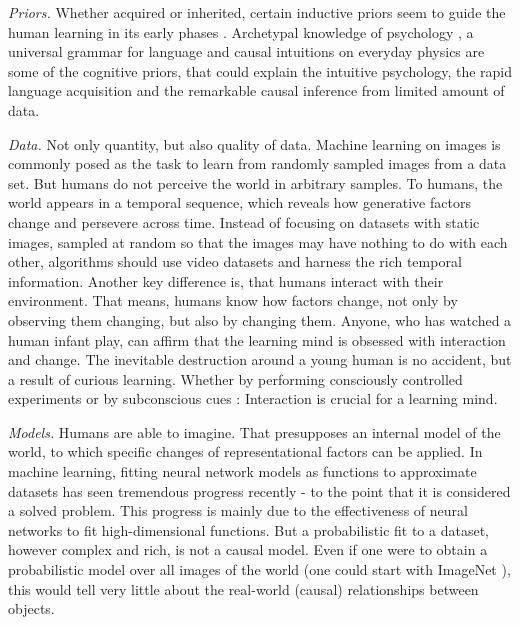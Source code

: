 	\emph{Priors.}
		Whether acquired or inherited, certain inductive priors seem to guide the human learning in its early phases \cite{tenenbaum18think}.
		Archetypal knowledge of psychology \cite{jung68archetype}, a universal grammar for language \cite{chomsky00horizons} and causal intuitions on everyday physics \cite{teglas11intuitive} are some of the cognitive priors, that could explain the intuitive psychology, the rapid language acquisition and the remarkable causal inference from limited amount of data.

	\emph{Data.}
		Not only quantity, but also quality of data. Machine learning on images is commonly posed as the task to learn from randomly sampled images from a data set. But humans do not perceive the world in arbitrary samples.
		To humans, the world appears in a temporal sequence, which reveals how generative factors change and persevere across time. Instead of focusing on datasets with static images, sampled at random so that the images may have nothing to do with each other, algorithms should use video datasets and harness the rich temporal information.
		Another key difference is, that humans interact with their environment.
		That means, humans know how factors change, not only by observing them changing, but also by changing them.
		Anyone, who has watched a human infant play, can affirm that the learning mind is obsessed with interaction and change. The inevitable destruction around a young human is no accident, but a result of curious learning.
		Whether by performing consciously controlled experiments or by subconscious cues \cite{wall08egomotion}: Interaction is crucial for a learning mind.

	\emph{Models.}
		Humans are able to imagine. That presupposes an internal model of the world, to which specific changes of representational factors can be applied.
		In machine learning, fitting neural network models as functions to approximate datasets has seen tremendous progress recently - to the point that it is considered a solved problem. This progress is mainly due to the effectiveness of neural networks to fit high-dimensional functions. But a probabilistic fit to a dataset, however complex and rich, is not a causal model. Even if one were to obtain a probabilistic model over all images of the world (one could start with \eg ImageNet \cite{russakovsky15imagenet}), this would tell very little about the real-world (causal) relationships between objects.

